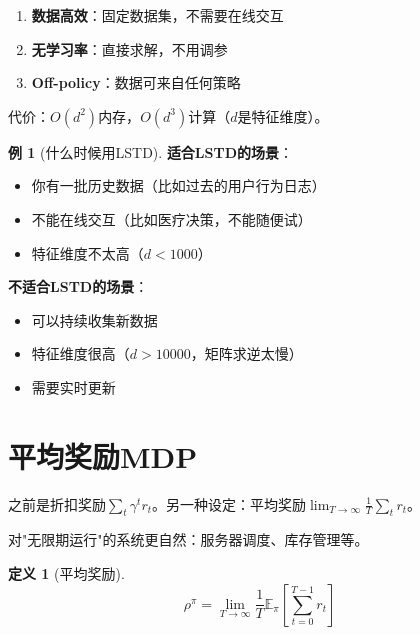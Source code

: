 \documentclass[11pt,a4paper]{article}
\theoremstyle{definition}
\newtheorem{definition}{定义}[section]
\newtheorem{example}{例}[section]
\begin{document}
\begin{keypoint}[LSTD的优势]
\begin{enumerate}
    \item \textbf{数据高效}：固定数据集，不需要在线交互
    \item \textbf{无学习率}：直接求解，不用调参
    \item \textbf{Off-policy}：数据可来自任何策略
\end{enumerate}

代价：$O(d^2)$内存，$O(d^3)$计算（$d$是特征维度）。
\end{keypoint}

\begin{example}[什么时候用LSTD]
\textbf{适合LSTD的场景}：
\begin{itemize}
    \item 你有一批历史数据（比如过去的用户行为日志）
    \item 不能在线交互（比如医疗决策，不能随便试）
    \item 特征维度不太高（$d < 1000$）
\end{itemize}

\textbf{不适合LSTD的场景}：
\begin{itemize}
    \item 可以持续收集新数据
    \item 特征维度很高（$d > 10000$，矩阵求逆太慢）
    \item 需要实时更新
\end{itemize}
\end{example}

\section{平均奖励MDP}

\begin{plainwords}
之前是折扣奖励$\sum_t \gamma^t r_t$。另一种设定：平均奖励$\lim_{T\to\infty} \frac{1}{T}\sum_t r_t$。

对"无限期运行"的系统更自然：服务器调度、库存管理等。
\end{plainwords}

\begin{definition}[平均奖励]
\[
\rho^\pi = \lim_{T\to\infty} \frac{1}{T} \mathbb{E}_\pi\left[\sum_{t=0}^{T-1} r_t\right]
\]
\end{definition}
\end{document}
